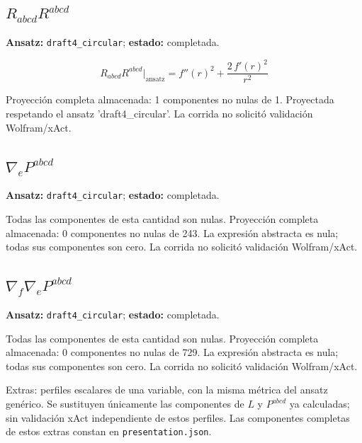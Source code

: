 \documentclass[11pt]{article}
\begin{document}
\subsection*{$ R_{abcd}R^{abcd} $}
\textbf{Ansatz:} \texttt{draft4\_circular}; \textbf{estado:} completada.\par
\begin{dmath*}[breakdepth={5}]
R_{abcd}R^{abcd}\big|_{\mathrm{ansatz}} = {f''\!\left(r\right)}^{2} + \frac{2\,{f'\!\left(r\right)}^{2}}{{r}^{2}}
\end{dmath*}
\par\smallskip
Proyección completa almacenada: 1 componentes no nulas de 1. Proyectada respetando el ansatz 'draft4\_circular'. La corrida no solicitó validación Wolfram/xAct.\par\medskip
{}
\subsection*{$ \nabla_e P^{abcd} $}
\textbf{Ansatz:} \texttt{draft4\_circular}; \textbf{estado:} completada.\par
Todas las componentes de esta cantidad son nulas.
Proyección completa almacenada: 0 componentes no nulas de 243. La expresión abstracta es nula; todas sus componentes son cero. La corrida no solicitó validación Wolfram/xAct.\par\medskip
{}
\subsection*{$ \nabla_f\nabla_e P^{abcd} $}
\textbf{Ansatz:} \texttt{draft4\_circular}; \textbf{estado:} completada.\par
Todas las componentes de esta cantidad son nulas.
Proyección completa almacenada: 0 componentes no nulas de 729. La expresión abstracta es nula; todas sus componentes son cero. La corrida no solicitó validación Wolfram/xAct.\par\medskip
\par\medskip Extras: perfiles escalares de una variable, con la misma métrica del ansatz genérico. Se sustituyen únicamente las componentes de $L$ y $P^{abcd}$ ya calculadas; sin validación xAct independiente de estos perfiles. Las componentes completas de estos extras constan en \texttt{presentation.json}.
\end{document}
